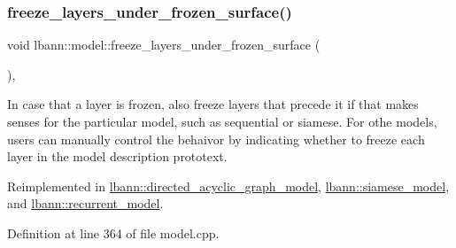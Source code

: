 \subsubsection{\texorpdfstring{freeze\+\_\+layers\+\_\+under\+\_\+frozen\+\_\+surface()}{freeze\_layers\_under\_frozen\_surface()}}
{\footnotesize\ttfamily void lbann\+::model\+::freeze\+\_\+layers\+\_\+under\+\_\+frozen\+\_\+surface (\begin{DoxyParamCaption}{ }\end{DoxyParamCaption})\hspace{0.3cm}{\ttfamily [protected]}, {\ttfamily [virtual]}}

In case that a layer is frozen, also freeze layers that precede it if that makes senses for the particular model, such as sequential or siamese. For othe models, users can manually control the behaivor by indicating whether to freeze each layer in the model description prototext. 

Reimplemented in \hyperlink{classlbann_1_1directed__acyclic__graph__model_a9f2a6e9472235ec91c5a50356471b3cb}{lbann\+::directed\+\_\+acyclic\+\_\+graph\+\_\+model}, \hyperlink{classlbann_1_1siamese__model_a3960a32fd45059516f3acb41549e1e92}{lbann\+::siamese\+\_\+model}, and \hyperlink{classlbann_1_1recurrent__model_aa4e43de8bf0d11a0f51dedbcf22a73cc}{lbann\+::recurrent\+\_\+model}.



Definition at line 364 of file model.\+cpp.



